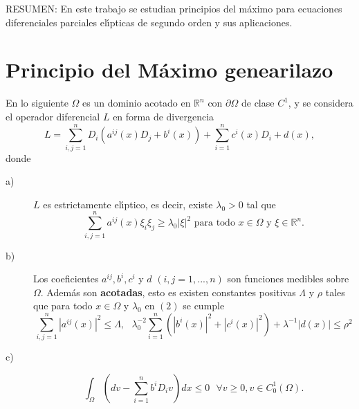 \documentclass{article}
\begin{document}
RESUMEN: En este trabajo se estudian principios del m\'{a}ximo para
ecuaciones diferenciales parciales el\'{\i}pticas de segundo orden y sus
aplicaciones.

\section{Principio del M\'{a}ximo genearilazo}

En lo siguiente $\Omega $ es un dominio acotado en $\mathbb{R}^{n}$ con $%
\partial \Omega $ de clase $C^{1}$, y se considera el operador diferencial $%
L $ en forma de divergencia 
\begin{equation}
L=\sum_{i,j=1}^{n}D_{i}\left( a^{ij}\left( x\right) D_{j}+b^{i}\left(
x\right) \right) +\sum_{i=1}^{n}c^{i}\left( x\right) D_{i}+d\left( x\right) ,
\tag{1}
\end{equation}
donde

\begin{description}
\item[a)]  $L$ es estrictamente el\'{\i}ptico, es decir, existe $\lambda
_{0}>0$ tal que 
\begin{equation}
\sum_{i,j=1}^{n}a^{ij}\left( x\right) \xi _{i}\xi _{j}\geq \lambda
_{0}\left\vert \xi \right\vert ^{2}\text{ para todo }x\in \Omega \text{ y }%
\xi \in \mathbb{R}^{n}.  \tag{2}
\end{equation}

\item[b)]  Los coeficientes $a^{ij},b^{i},c^{i}$ y $d$ $\left(
i,j=1,...,n\right) $ son funciones medibles sobre $\Omega $. Adem\'{a}s son 
\textbf{acotadas}, esto es existen constantes positivas $\Lambda $ y $\rho $
tales que para todo $x\in \Omega $ y $\lambda _{0}$ en $\left( 2\right) $ se
cumple 
\begin{equation}
\sum_{i,j=1}^{n}\left\vert a^{ij}\left( x\right) \right\vert ^{2}\leq
\Lambda ,\text{ \ }\lambda _{0}^{-2}\sum_{i=1}^{n}\left( \left\vert
b^{i}\left( x\right) \right\vert ^{2}+\left\vert c^{i}\left( x\right)
\right\vert ^{2}\right) +\lambda ^{-1}\left\vert d\left( x\right)
\right\vert \leq \rho ^{2}  \tag{3}
\end{equation}

\item[c)]  
\begin{equation}
\int_{\Omega }\left( dv-\sum_{i=1}^{n}b^{i}D_{i}v\right) dx\leq 0\text{ \ }%
\forall v\geq 0,v\in C_{0}^{1}\left( \Omega \right) .  \tag{4}
\end{equation}
\end{description}
\end{document}
